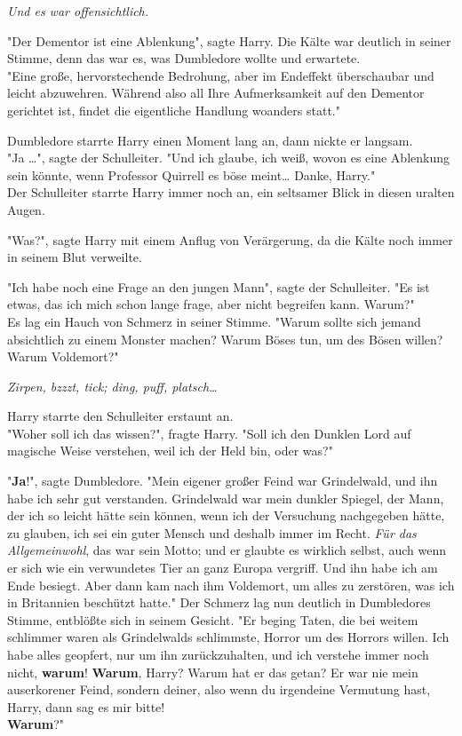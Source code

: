 {\emph{Und es war offensichtlich.}

"Der Dementor ist eine Ablenkung", sagte Harry. Die Kälte war deutlich in seiner Stimme, denn das war es, was Dumbledore wollte und erwartete.\\ "Eine große, hervorstechende Bedrohung, aber im Endeffekt überschaubar und leicht abzuwehren. Während also all Ihre Aufmerksamkeit auf den Dementor gerichtet ist, findet die eigentliche Handlung woanders statt."

Dumbledore starrte Harry einen Moment lang an, dann nickte er langsam.\\ "Ja …", sagte der Schulleiter. "Und ich glaube, ich weiß, wovon es eine Ablenkung sein könnte, wenn Professor Quirrell es böse meint… Danke, Harry."\\ Der Schulleiter starrte Harry immer noch an, ein seltsamer Blick in diesen uralten Augen.

"Was?", sagte Harry mit einem Anflug von Verärgerung, da die Kälte noch immer in seinem Blut verweilte.

"Ich habe noch eine Frage an den jungen Mann", sagte der Schulleiter. "Es ist etwas, das ich mich schon lange frage, aber nicht begreifen kann. Warum?"\\ Es lag ein Hauch von Schmerz in seiner Stimme. "Warum sollte sich jemand absichtlich zu einem Monster machen? Warum Böses tun, um des Bösen willen? Warum Voldemort?"

\emph{Zirpen, bzzzt, tick; ding, puff, platsch…}

Harry starrte den Schulleiter erstaunt an.\\ "Woher soll ich das wissen?", fragte Harry. "Soll ich den Dunklen Lord auf magische Weise verstehen, weil ich der Held bin, oder was?"

"\textbf{Ja}!", sagte Dumbledore. "Mein eigener großer Feind war Grindelwald, und ihn habe ich sehr gut verstanden. Grindelwald war mein dunkler Spiegel, der Mann, der ich so leicht hätte sein können, wenn ich der Versuchung nachgegeben hätte, zu glauben, ich sei ein guter Mensch und deshalb immer im Recht. \emph{Für das Allgemeinwohl}, das war sein Motto; und er glaubte es wirklich selbst, auch wenn er sich wie ein verwundetes Tier an ganz Europa vergriff. Und ihn habe ich am Ende besiegt. Aber dann kam nach ihm Voldemort, um alles zu zerstören, was ich in Britannien beschützt hatte." Der Schmerz lag nun deutlich in Dumbledores Stimme, entblößte sich in seinem Gesicht. "Er beging Taten, die bei weitem schlimmer waren als Grindelwalds schlimmste, Horror um des Horrors willen. Ich habe alles geopfert, nur um ihn zurückzuhalten, und ich verstehe immer noch nicht, \textbf{warum}! \textbf{Warum}, Harry? Warum hat er das getan? Er war nie mein auserkorener Feind, sondern deiner, also wenn du irgendeine Vermutung hast, Harry, dann sag es mir bitte!\\ \textbf{Warum}?"

}
